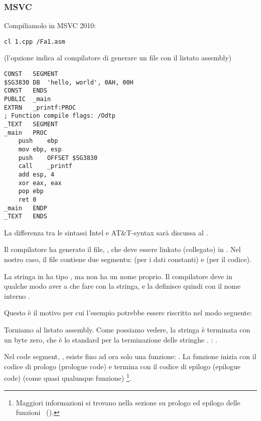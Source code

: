 \subsubsection{MSVC}

Compiliamolo in MSVC 2010:

\begin{lstlisting}
cl 1.cpp /Fa1.asm
\end{lstlisting}

(l'opzione  indica al compilatore di generare un file con il listato assembly)

\begin{lstlisting}[caption=MSVC 2010,style=customasm]
CONST	SEGMENT
$SG3830	DB	'hello, world', 0AH, 00H
CONST	ENDS
PUBLIC	_main
EXTRN	_printf:PROC
; Function compile flags: /Odtp
_TEXT	SEGMENT
_main	PROC
	push	ebp
	mov	ebp, esp
	push	OFFSET $SG3830
	call	_printf
	add	esp, 4
	xor	eax, eax
	pop	ebp
	ret	0
_main	ENDP
_TEXT	ENDS
\end{lstlisting}

\ITAph{}
La differenza tra le sintassi Intel e AT\&T-syntax sarà discussa al .

Il compilatore ha generato il file, , che deve essere linkato (collegato) in .
Nel nostro caso, il file contiene due segmentu:  (per i dati constanti) e  (per il codice).

\label{string_is_const_char}
La stringa  in \CCpp ha tipo , ma non ha un nome proprio.
Il compilatore deve in qualche modo aver a che fare con la stringa, e la definisce quindi con il nome interno .

Questo è il motivo per cui l'esempio potrebbe essere riscritto nel modo seguente:



Torniamo al listato assembly. Come possiamo vedere, la stringa è terminata con un byte zero, che è lo standard per la terminazione delle stringhe \CCpp.
\ITAph{}: .

Nel code segment, , esiste fino ad ora solo una funzione: \main{}.
La funzione \main inizia con il codice di prologo (prologue code) e termina con il codice di epilogo (epilogue code) (come quasi qualunque funzione)
\footnote{Maggiori informazioni si trovano nella sezione su prologo ed epilogo delle funzioni ~().}.

